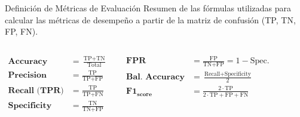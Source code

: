 \documentclass{beamer}
\begin{document}
\begin{frame}{Definición de Métricas de Evaluación}
	\small
	\justifying
	Resumen de las fórmulas utilizadas para calcular las métricas de desempeño a partir de la matriz de confusión (TP, TN, FP, FN).
	
	\vspace{0.3cm}
	
	\begin{columns}[T]

		\begin{block}{}
			\footnotesize
			\begin{align*}
				\textbf{Accuracy} &= \frac{\text{TP} + \text{TN}}{\text{Total}} \\[1em]
				\textbf{Precision} &= \frac{\text{TP}}{\text{TP} + \text{FP}} \\[1em]
				\textbf{Recall (TPR)} &= \frac{\text{TP}}{\text{TP} + \text{FN}} \\[1em]
				\textbf{Specificity} &= \frac{\text{TN}}{\text{TN} + \text{FP}}
			\end{align*}
		\end{block}
		
		\column{0.48\textwidth}
		\begin{block}{}
			\footnotesize
			\begin{align*}
				\textbf{FPR} &= \frac{\text{FP}}{\text{TN} + \text{FP}} = 1 - \text{Spec.} \\[1em]
				\textbf{Bal. Accuracy} &= \frac{\text{Recall} + \text{Specificity}}{2} \\[1em]
				\textbf{F1}_{\textbf{score}} &= \frac{2 \cdot \text{TP}}{2 \cdot \text{TP} + \text{FP} + \text{FN}}
			\end{align*}
		\end{block}
	\end{columns}
	
	\vspace{0.2cm}
	\centering
\end{frame}
\end{document}
